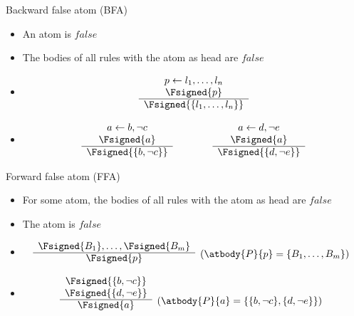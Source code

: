 \begin{frame}{Backward false atom (BFA)}
\begin{itemize}
\item {} An atom is $\mathit{false}$
\item {} The bodies of all rules with the atom as head are $\mathit{false}$
\item {}
\[
\begin{array}{c}
p \leftarrow l_1,\dots,l_n \\
\Fsigned{p} \\\hline
\Fsigned{\{l_1,\dots,l_n\}}
\end{array}
\]
\item<2-> 
\[
\begin{array}{c}
a \leftarrow b, \neg c \\
\Fsigned{a} \\\hline
\Fsigned{\{b, \neg c\}}
\end{array}
\qquad\qquad
\begin{array}{c}
a \leftarrow d, \neg e \\
\Fsigned{a} \\\hline
\Fsigned{\{d, \neg e\}}
\end{array}
\hfill
\]
\end{itemize}
\end{frame}
\begin{frame}{Forward false atom (FFA)}
\begin{itemize}
\item {} For some atom, the bodies of all rules with the atom as head are $\mathit{false}$
\item {} The atom is $\mathit{false}$
\item {}
\[
\begin{array}{cl}
\Fsigned{B_1},\dots,\Fsigned{B_m} &
\raisebox{-8pt}[0pt][0pt]{($\atbody{P}{p} = \{B_1,\dots,B_m\}$)}
\\\cline{1-1}
\Fsigned{p}
\end{array}
\]
\item<2-> 
\[
\begin{array}{cl}
\Fsigned{\{b,\neg c\}} \\
\Fsigned{\{d,\neg e\}} &
\raisebox{-8pt}[0pt][0pt]{($\atbody{P}{a} = \{\{b,\neg c\},\{d,\neg e\}\}$)}
\\\cline{1-1}
\Fsigned{a}
\end{array}
\]
\end{itemize}
\end{frame}
